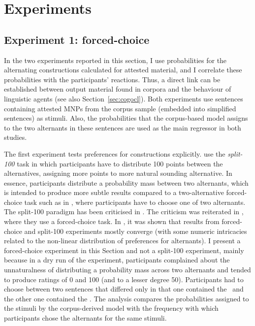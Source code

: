 \section{Experiments}
\label{sec:experimental}

\subsection{Experiment 1: forced-choice}
\label{sec:exp:fc}

In the two experiments reported in this section, I use probabilities for the alternating constructions calculated for attested material, and I correlate these probabilities with the participants' reactions.
Thus, a direct link can be established between output material found in corpora and the behaviour of linguistic agents (see also Section~\ref{sec:cogocl}).
Both experiments use sentences containing attested MNPs from the corpus sample (embedded into simplified sentences) as stimuli.
Also, the probabilities that the corpus-based model assigns to the two alternants in these sentences are used as the main regressor in both studies.

The first experiment tests preferences for constructions explicitly.
\cite{FordBresnan2013} use the \textit{split-100} task in which participants have to distribute 100 points between the alternatives, assigning more points to more natural sounding alternative.
In essence, participants distribute a probability mass between two alternants, which is intended to produce more subtle results compared to a two-alternative forced-choice task such as in \cite{Rosenbach2013}, where participants have to choose one of two alternants.
The split-100 paradigm has been criticised in \cite{ArppeJaervikivi2007}.
The criticism was reiterated in \cite{DivjakEa2016}, where they use a forced-choice task.
In \cite{VerhoevenTemme2017}, it was shown that results from forced-choice and split-100 experiments mostly converge (with some numeric intricacies related to the non-linear distribution of preferences for alternants).
I present a forced-choice experiment in this Section and not a split-100 experiment, mainly because in a dry run of the experiment, participants complained about the unnaturalness of distributing a probability mass across two alternants and tended to produce ratings of 0 and 100 (and to a lesser degree 50).
Participants had to choose between two sentences that differed only in that one contained the \NACa\, and the other one contained the \PGCa.
The analysis compares the probabilities assigned to the stimuli by the corpus-derived model with the frequency with which participants chose the alternants for the same stimuli.

